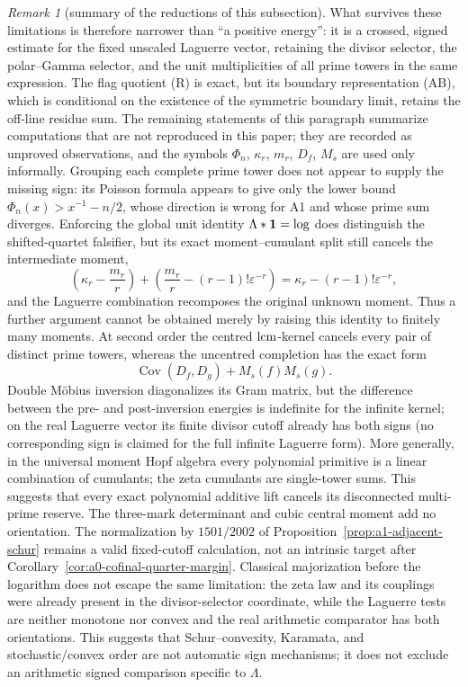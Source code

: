 \documentclass[11pt]{amsart}
\theoremstyle{definition}
\theoremstyle{remark}
\newtheorem{remark}[theorem]{Remark}
\theoremstyle{definition}
\begin{document}
\begin{remark}[summary of the reductions of this subsection]
What survives these limitations is therefore narrower than ``a positive energy'': it is a crossed, signed
estimate for the fixed unscaled Laguerre vector, retaining the divisor selector, the polar--Gamma
selector, and the unit multiplicities of all prime towers in the same expression.  The flag quotient (R) is
exact, but its boundary representation (AB), which is conditional on the existence of the
symmetric boundary limit, retains the off-line residue sum.  The remaining statements of this
paragraph summarize computations that are not reproduced in this paper; they are recorded as
unproved observations, and the symbols $\Phi_n$, $\kappa_r$, $m_r$, $D_f$, $M_s$ are used only
informally.  Grouping each complete prime tower does not appear to supply the missing sign: its
Poisson formula appears to give only the lower bound
\(\Phi_n(x)>x^{-1}-n/2\), whose direction is wrong for A1 and whose prime sum diverges.  Enforcing
the global unit identity \(\Lambda*{\bf 1}=\log\) does distinguish the shifted-quartet falsifier, but
its exact moment--cumulant split still cancels the intermediate moment,
\[
 \left(\kappa_r-\frac{m_r}{r}\right)
 +\left(\frac{m_r}{r}-(r-1)!\varepsilon^{-r}\right)
 =\kappa_r-(r-1)!\varepsilon^{-r},
\]
and the Laguerre combination recomposes the original unknown moment.  Thus a further argument cannot be obtained merely by raising this identity to finitely many moments.  At second
order the centred \({\rm lcm}\)-kernel cancels every pair of distinct prime towers, whereas the
uncentred completion has the exact form
\[
 \operatorname {Cov}(D_f,D_g)+M_s(f)M_s(g).
\]
Double M\"obius inversion diagonalizes its Gram matrix, but the difference between the pre- and
post-inversion energies is indefinite for the infinite kernel; on the real Laguerre vector its finite
divisor cutoff already has both signs (no corresponding sign is claimed for the full infinite
Laguerre form).  More generally, in the universal moment Hopf algebra every polynomial primitive is
a linear combination of cumulants; the zeta cumulants are single-tower sums.  This suggests that every exact
polynomial additive lift cancels its disconnected multi-prime reserve.  The three-mark determinant
and cubic central moment add no orientation.  The normalization by
$1501/2002$ of Proposition~\ref{prop:a1-adjacent-schur} remains a valid fixed-cutoff calculation, not an intrinsic target after
Corollary~\ref{cor:a0-cofinal-quarter-margin}.  Classical majorization before the logarithm does not
escape the same limitation: the zeta law and its couplings were already present in the divisor-selector
coordinate, while the Laguerre tests are neither monotone nor convex and the real arithmetic
comparator has both orientations.  This suggests that Schur--convexity, Karamata, and stochastic/convex
order are not automatic sign mechanisms; it does not exclude an arithmetic signed comparison specific
to $\Lambda$.


\end{remark}
\end{document}
